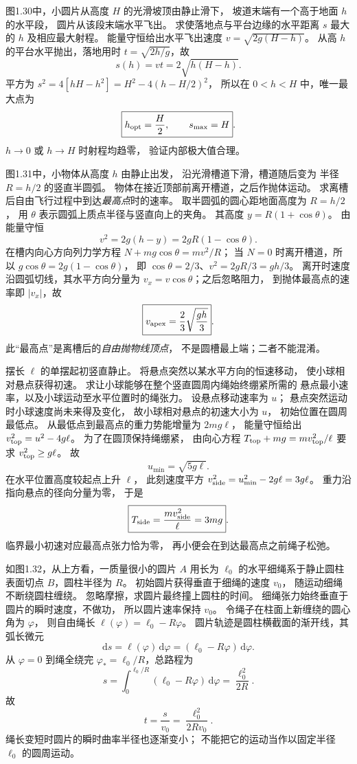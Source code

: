图1.30中，小圆片从高度 $H$ 的光滑坡顶由静止滑下，
坡道末端有一个高于地面 $h$ 的水平段，
圆片从该段末端水平飞出。
求使落地点与平台边缘的水平距离 $s$ 最大的 $h$
及相应最大射程。
\exsolution
能量守恒给出水平飞出速度
$v=\sqrt{2g(H-h)}$。
从高 $h$ 的平台水平抛出，落地用时
$t=\sqrt{2h/g}$，故
\[
s(h)=vt=2\sqrt{h(H-h)}.
\]
平方为
$s^2=4[hH-h^2]=H^2-4(h-H/2)^2$，
所以在 $0<h<H$ 中，唯一最大点为
\[
\boxed{h_{\rm opt}=\frac H2,\qquad
s_{\max}=H}.
\]
\excheck $h\to0$ 或 $h\to H$ 时射程均趋零，
验证内部极大值合理。

图1.31中，小物体从高度 $h$ 由静止出发，
沿光滑槽道下滑，槽道随后变为
半径 $R=h/2$ 的竖直半圆弧。
物体在接近顶部前离开槽道，之后作抛体运动。
求离槽后自由飞行过程中到达\emph{最高点}时的速率。
\exsolution
取半圆弧的圆心距地面高度为 $R=h/2$，
用 $\theta$ 表示圆弧上质点半径与竖直向上的夹角。
其高度 $y=R(1+\cos\theta)$。
由能量守恒
\[
v^2=2g(h-y)=2gR(1-\cos\theta).
\]
在槽内向心方向列力学方程
$N+mg\cos\theta=mv^2/R$；
当 $N=0$ 时离开槽道，所以
$g\cos\theta=2g(1-\cos\theta)$，
即 $\cos\theta=2/3$、$v^2=2gR/3=gh/3$。
离开时速度沿圆弧切线，其水平方向分量为
$v_x=v\cos\theta$；之后忽略阻力，
到抛体最高点的速率即 $|v_x|$，故
\[
\boxed{v_{\rm apex}=\frac23\sqrt{\frac{gh}{3}}}.
\]
\excheck 此“最高点”是离槽后的\emph{自由抛物线顶点}，
不是圆槽最上端；二者不能混淆。

摆长 $\ell$ 的单摆起初竖直静止。
将悬点突然以某水平方向的恒速移动，
使小球相对悬点获得初速。
求让小球能够在整个竖直圆周内绳始终绷紧所需的
悬点最小速率，以及小球运动至水平位置时的绳张力。
\exsolution
设悬点移动速率为 $u$；
悬点突然运动时小球速度尚未来得及变化，
故小球相对悬点的初速大小为 $u$，
初始位置在圆周最低点。
从最低点到最高点的重力势能增量为 $2mg\ell$，
能量守恒给出
$v_{\rm top}^2=u^2-4g\ell$。
为了在圆顶保持绳绷紧，
由向心方程 $T_{\rm top}+mg=mv_{\rm top}^2/\ell$
要求 $v_{\rm top}^2\ge g\ell$。
故
\[
\boxed{u_{\min}=\sqrt{5g\ell}}.
\]
在水平位置高度较起点上升 $\ell$，
此刻速度平方
$v_{\rm side}^2=u_{\min}^2-2g\ell=3g\ell$。
重力沿指向悬点的径向分量为零，
于是
\[
\boxed{T_{\rm side}=\frac{mv_{\rm side}^2}{\ell}=3mg}.
\]
\excheck 临界最小初速对应最高点张力恰为零，
再小便会在到达最高点之前绳子松弛。

如图1.32，从上方看，一质量很小的圆片 $A$
用长为 $\ell_0$ 的水平细绳系于静止圆柱
表面切点 $B$，圆柱半径为 $R$。
初始圆片获得垂直于细绳的速度 $v_0$，
随运动细绳不断绕圆柱缠绕。
忽略摩擦，求圆片最终撞上圆柱的时间。
\exsolution
细绳张力始终垂直于圆片的瞬时速度，不做功，
所以圆片速率保持 $v_0$。
令绳子在柱面上新缠绕的圆心角为 $\varphi$，
则自由绳长
$\ell(\varphi)=\ell_0-R\varphi$。
圆片轨迹是圆柱横截面的渐开线，其弧长微元
\[
\mathrm ds=\ell(\varphi)\,\mathrm d\varphi
=(\ell_0-R\varphi)\,\mathrm d\varphi.
\]
从 $\varphi=0$ 到绳全绕完
$\varphi_*=\ell_0/R$，总路程为
\[
s=\int_0^{\ell_0/R}
(\ell_0-R\varphi)\,\mathrm d\varphi
=\frac{\ell_0^2}{2R}.
\]
故
\[
\boxed{t=\frac{s}{v_0}=\frac{\ell_0^2}{2Rv_0}}.
\]
\excheck 绳长变短时圆片的瞬时曲率半径也逐渐变小；
不能把它的运动当作以固定半径 $\ell_0$ 的圆周运动。

